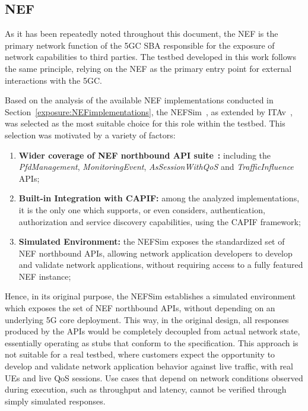 \subsection{\acs{NEF}}
\label{chap:impl:exposure:nef}

As it has been repeatedly noted throughout this document, the \acs{NEF} is the primary network function of the \acs{5GC} \acs{SBA} responsible for the exposure of network capabilities to third parties. The testbed developed in this work follows the same principle, relying on the \acs{NEF} as the primary entry point for external interactions with the \acs{5GC}.

Based on the analysis of the available \acs{NEF} implementations conducted in Section~\ref{exposure:NEFimplementations}, the NEFSim~\cite{NEFsim}, as extended by \acs{ITAv}~\cite{NEFemulatorAtnog}, was selected as the most suitable choice for this role within the testbed. This selection was motivated by a variety of factors:

\begin{enumerate}
    \item \textbf{Wider coverage of \acs{NEF} northbound \acs{API} suite}~\cite{ETSI_TS_129_522_V18_11_0}\textbf{:} including the \textit{PfdManagement}, \textit{MonitoringEvent}, \textit{AsSessionWithQoS} and \textit{TrafficInfluence} \acsp{API};
    \item \textbf{Built-in Integration with \acs{CAPIF}:} among the analyzed implementations, it is the only one which supports, or even considers, authentication, authorization and service discovery capabilities, using the \acs{CAPIF} framework;
    \item \textbf{Simulated Environment:} the NEFSim exposes the standardized set of \acs{NEF} northbound \acsp{API}, allowing network application developers to develop and validate network applications, without requiring access to a fully featured \acs{NEF} instance;
\end{enumerate}

Hence, in its original purpose, the NEFSim establishes a simulated environment which exposes the set of \acs{NEF} northbound \acsp{API}, without depending on an underlying \acs{5G} core deployment. This way, in the original design, all responses produced by the \acsp{API} would be completely decoupled from actual network state, essentially operating as stubs that conform to the specification. This approach is not suitable for a real testbed, where customers expect the opportunity to develop and validate network application behavior against live traffic, with real \acsp{UE} and live \acs{QoS} sessions. Use cases that depend on network conditions observed during execution, such as throughput and latency, cannot be verified through simply simulated responses.

